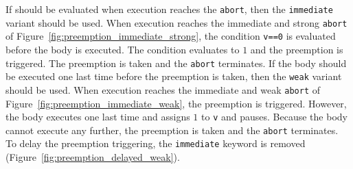 If \expression{} should be evaluated when execution reaches the \verb$abort$, 
then the \verb$immediate$ variant should be used. When execution 
reaches the immediate and strong \verb$abort$ of Figure~\ref{fig:preemption_immediate_strong},
the condition \verb$v==0$ is evaluated before the body 
is executed. The condition evaluates to $1$ and the preemption 
is triggered. The preemption is taken and the \verb$abort$ terminates.
If the body should be executed one last time before the preemption 
is taken, then the \verb$weak$ variant should be used. 
When execution reaches the immediate and weak \verb$abort$ of 
Figure~\ref{fig:preemption_immediate_weak},
the preemption is triggered. 
However, the body executes one last time and assigns $1$ to \verb$v$ 
and pauses. Because the body cannot execute any further, 
the preemption is taken and the \verb$abort$ terminates.
To delay the preemption triggering, the \verb$immediate$ 
keyword is removed (Figure~\ref{fig:preemption_delayed_weak}).



